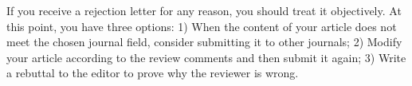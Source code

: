 If you receive a rejection letter for any reason, you should treat it objectively. At this point, you have three options: 1) When the content of your article does not meet the chosen journal field, consider submitting it to other journals; 2) Modify your article according to the review comments and then submit it again; 3) Write a rebuttal to the editor to prove why the reviewer is wrong.



% 
